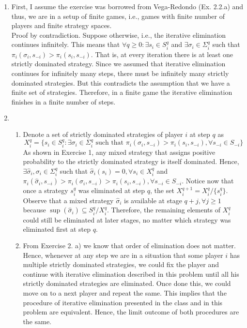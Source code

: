 \documentclass[]{article}
\begin{document}
\begin{enumerate}
	\item First, I assume the exercise was borrowed from Vega-Redondo (Ex. 2.2.a) and thus, we are in a setup of finite games, i.e., games with finite number of players and finite strategy spaces.\\
	Proof by contradiction. Suppose otherwise, i.e., the iterative elimination continues infinitely. This means that $\forall q\geq0: \exists s_i\in S_i^q$ and $\exists\sigma_i\in\Sigma_i^q$ such that $\pi_i(\sigma_i, s_{-i}) > \pi_i(s_i, s_{-i})$. That is, at every iteration there is at least one strictly dominated strategy. Since we assumed that iterative elimination continues for infinitely many steps, there must be infinitely many strictly dominated strategies. But this contradicts the assumption that we have a finite set of strategies. Therefore, in a finite game the iterative elimination finishes in a finite number of steps.
	\item \begin{enumerate}[label=\alph*)]
		\item Denote a set of strictly dominated strategies of player $i$ at step $q$ as
		\begin{equation}
			X_i^q = \{s_i\in S_i^q: \exists\sigma_i\in\Sigma_i^q \text{ such that }\pi_i(\sigma_i, s_{-i}) > \pi_i(s_i, s_{-i}), \forall s_{-i}\in S_{-i}\} \nonumber
		\end{equation}
		As shown in Exercise 1, any mixed strategy that assigns positive probability to the strictly dominated strategy is itself dominated. Hence, $\exists\hat{\sigma}_i, \sigma_i\in\Sigma_i^q$ such that $\hat{\sigma}_i(s_i) = 0, \forall s_i\in X_i^q$ and $\pi_i(\hat{\sigma}_i, s_{-i}) > \pi_i(\sigma_i, s_{-i}) > \pi_i(s_i, s_{-i}), \forall s_{-i}\in S_{-i}$. Notice now that once a strategy $s_i^q$ was eliminated at step $q$, the set $X_i^{q+1} = X_i^q/\{s_i^q\}$. Observe that a mixed strategy $\hat{\sigma}_i$ is available at stage $q+j, \forall j\geq1$ because $\sup(\hat{\sigma}_i)\subseteq S_i^q/X_i^q$. Therefore, the remaining elements of $X_i^q$ could still be eliminated at later stages, no matter which strategy was eliminated first at step $q$.
	\item From Exercise 2. a) we know that order of elimination does not matter. Hence, whenever at any step we are in a situation that some player $i$ has multiple strictly dominated strategies, we could fix the player and continue with iterative elimination described in this problem until all his strictly dominated strategies are eliminated. Once done this, we could move on to a next player and repeat the same. This implies that the procedure of iterative elimination presented in the class and in this problem are equivalent. Hence, the limit outcome of both procedures are the same.
	\end{enumerate}
\end{enumerate}
\end{document}

